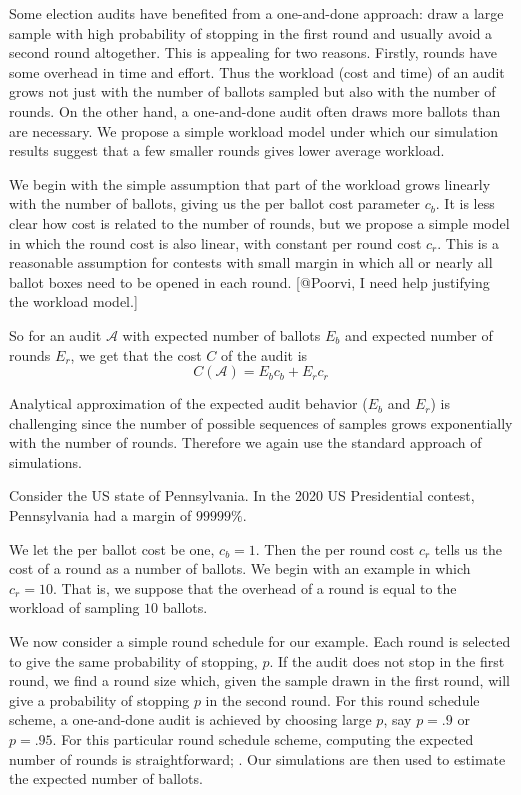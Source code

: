 Some election audits have benefited from a one-and-done approach: draw a large sample with high probability of stopping in the first round and usually avoid a second round altogether. This is appealing for two reasons. Firstly, rounds have some overhead in time and effort. Thus the workload (cost and time) of an audit grows not just with the number of ballots sampled but also with the number of rounds. On the other hand, a one-and-done audit often draws more ballots than are necessary. We propose a simple workload model under which our simulation results suggest that a few smaller rounds gives lower average workload. 

We begin with the simple assumption that part of the workload grows linearly with the number of ballots, giving us the per ballot cost parameter $c_{b}$. It is less clear how cost is related to the number of rounds, but we propose a simple model in which the round cost is also linear, with constant per round cost $c_{r}$. This is a reasonable assumption for contests with small margin in which all or nearly all ballot boxes need to be opened in each round. [@Poorvi, I need help justifying the workload model.]

So for an audit $\mathcal{A}$ with expected number of ballots $E_{b}$ and expected number of rounds $E_{r}$, we get that the cost $C$ of the audit is
\begin{equation}
C(\mathcal{A}) = E_b c_b + E_r c_r
\label{eq:cost}
\end{equation}

Analytical approximation of the expected audit behavior ($E_b$ and $E_r$) is challenging since the number of possible sequences of samples grows exponentially with the number of rounds. 
Therefore we again use the standard approach of simulations.

Consider the US state of Pennsylvania. In the 2020 US Presidential contest, Pennsylvania had a margin of $99999\%$.

We let the per ballot cost be one, $c_b=1$. Then the per round cost $c_r$ tells us the cost of a round as a number of ballots. We begin with an example in which $c_r=10$. That is, we suppose that the overhead of a round is equal to the workload of sampling $10$ ballots.

We now consider a simple round schedule for our example. Each round is selected to give the same probability of stopping, $p$. If the audit does not stop in the first round, we find a round size which, given the sample drawn in the first round, will give a probability of stopping $p$ in the second round. For this round schedule scheme, a one-and-done audit is achieved by choosing large $p$, say $p=.9$ or $p=.95$. For this particular round schedule scheme, computing the expected number of rounds is straightforward; . Our simulations are then used to estimate the expected number of ballots.

